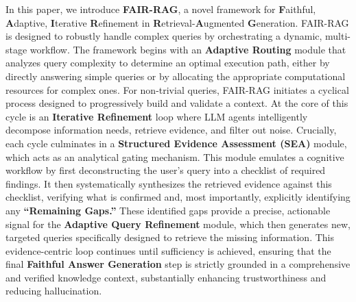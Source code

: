 \documentclass[11pt]{article}
\begin{document}
In this paper, we introduce \textbf{FAIR-RAG}, a novel framework for \textbf{F}aithful, \textbf{A}daptive, \textbf{I}terative \textbf{R}efinement in \textbf{R}etrieval-\textbf{A}ugmented \textbf{G}eneration. FAIR-RAG is designed to robustly handle complex queries by orchestrating a dynamic, multi-stage workflow. The framework begins with an \textbf{Adaptive Routing} module that analyzes query complexity to determine an optimal execution path, either by directly answering simple queries or by allocating the appropriate computational resources for complex ones. For non-trivial queries, FAIR-RAG initiates a cyclical process designed to progressively build and validate a context. At the core of this cycle is an \textbf{Iterative Refinement} loop where LLM agents intelligently decompose information needs, retrieve evidence, and filter out noise. Crucially, each cycle culminates in a \textbf{Structured Evidence Assessment (SEA)} module, which acts as an analytical gating mechanism. This module emulates a cognitive workflow by first deconstructing the user's query into a checklist of required findings. It then systematically synthesizes the retrieved evidence against this checklist, verifying what is confirmed and, most importantly, explicitly identifying any \textbf{``Remaining Gaps.''} These identified gaps provide a precise, actionable signal for the \textbf{Adaptive Query Refinement} module, which then generates new, targeted queries specifically designed to retrieve the missing information. This evidence-centric loop continues until sufficiency is achieved, ensuring that the final \textbf{Faithful Answer Generation} step is strictly grounded in a comprehensive and verified knowledge context, substantially enhancing trustworthiness and reducing hallucination.
\end{document}
